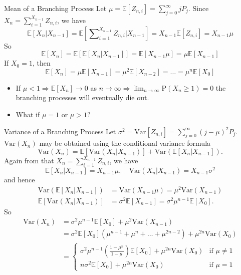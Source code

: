 \documentclass[letterpaper,handout, mathserif]{beamer}
\def\Sum{\sum\nolimits}
\def\p{\mathrm P}
\def\E{\mathbb E}
\def\V{\mathrm{Var}}
\begin{document}
\begin{frame}{Mean of a Branching Process}
Let $\mu=\E[Z_{n,i}]=\Sum_{j=0}^{\infty}jP_j$.
Since $X_{n} =\Sum_{i=1}^{X_{n-1}}Z_{n,i}$, we have
$$
\E[X_{n}|X_{n-1}]=\E\left[\Sum_{i=1}^{X_{n-1}}Z_{n,i}\Big|X_{n-1}\right]=X_{n-1}\E[Z_{n,i}]=X_{n-1}\mu
$$
So
$$
\E[X_{n}]=\E[\E[X_{n}|X_{n-1}]]=\E[X_{n-1}\mu]=\mu\E[X_{n-1}]
$$
If $X_0=1$, then
$$
\E[X_{n}]=\mu\E[X_{n-1}]=\mu^2\E[X_{n-2}]=\ldots=\mu^n\E[X_{0}]
$$
\begin{itemize}
\item If $\mu<1 \Rightarrow \E[X_{n}]\to 0$ as $n\to\infty \Rightarrow \lim_{n\to\infty}\p(X_n\ge1)=0$
the branching processes will eventually die out.
\item What if $\mu=1$ or $\mu>1$?
\end{itemize}
\end{frame}
\begin{frame}{Variance of a Branching Process}
Let $\sigma^2=\V[Z_{n,i}]=\Sum_{j=0}^{\infty}(j-\mu)^2P_j$.
$\V(X_n)$ may be obtained using the conditional variance formula
$$\V(X_{n}) = \E[\V(X_{n}|X_{n-1})] + \V(\E[X_{n}|X_{n-1}]).$$
Again from that $X_{n} =\Sum_{i=1}^{X_{n-1}}Z_{n,i}$, we have
$$
\E[X_{n}|X_{n-1}] = X_{n-1}\mu,\quad \V(X_{n}|X_{n-1}) = X_{n-1}\sigma^2
$$
and hence
\begin{align*}
\V(\E[X_{n}|X_{n-1}]) &= \V(X_{n-1}\mu)=\mu^2\V(X_{n-1})\\
\E[\V(X_{n}|X_{n-1})] &= \sigma^2\E[X_{n-1}]=\sigma^2\mu^{n-1}\E[X_0].
\end{align*}
So
\begin{align*}
\V(X_{n})&=\sigma^2\mu^{n-1}\E[X_0]+\mu^2\V(X_{n-1})\\
&=\sigma^2\E[X_0](\mu^{n-1}+\mu^{n}+\ldots+\mu^{2n-2})+\mu^{2n}\V(X_0)\\
&=\begin{cases}
\sigma^2\mu^{n-1}\left(\frac{1-\mu^{n}}{1-\mu}\right)\E[X_0] +\mu^{2n}\V(X_0)& \mbox{if } \mu\neq1\\
n\sigma^2\E[X_0] + \mu^{2n}\V(X_0)&\mbox{if } \mu=1
\end{cases}
\end{align*}
\end{frame}
\end{document}
